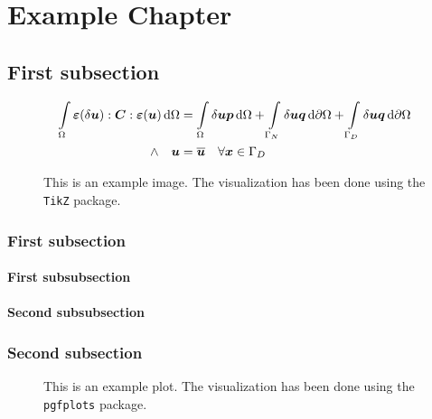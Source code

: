 \chapter{Example Chapter}
\blindtext[3]

\section{First subsection}
\blindtext[4]
\begin{equation}
	\begin{aligned}
		\int \limits_\Omega \boldsymbol{\varepsilon}(\delta\boldsymbol{u}) : \boldsymbol{C} : \boldsymbol{\varepsilon}(\boldsymbol{u})\,\mathrm{d}\Omega
		&= \int \limits_\Omega \delta\boldsymbol{u} \boldsymbol{p}\,\mathrm{d}\Omega
		 + \int \limits_{\Gamma_N} \delta\boldsymbol{u} \boldsymbol{q}\,\mathrm{d}\partial\Omega
		 + \int \limits_{\Gamma_D} \delta\boldsymbol{u} \boldsymbol{q}\,\mathrm{d}\partial\Omega \\
		\land \quad \boldsymbol{u} &= \overline{\boldsymbol{u}} \quad \forall \boldsymbol{x} \in \Gamma_D \\
	\end{aligned}
\end{equation}
\blindtext[2]
\begin{figure}
	\begin{center}
		
	\end{center}
	\caption{This is an example image. The visualization has been done using the \texttt{TikZ} package.}
	\label{fig:example_tikz_image}
\end{figure}
\subsection{First subsection}
 \blindtext[3]
\subsubsection{First subsubsection}
\blindtext[3]
\subsubsection{Second subsubsection}
\blindtext[3]
\subsection{Second subsection}
\blindtext[4]
\begin{figure}
	\begin{center}
		
	\end{center}
	\caption{This is an example plot. The visualization has been done using the \texttt{pgfplots} package.}
	\label{fig:example_tikz_image}
\end{figure}
\cite{bathe2007finite} \blindtext[5]

